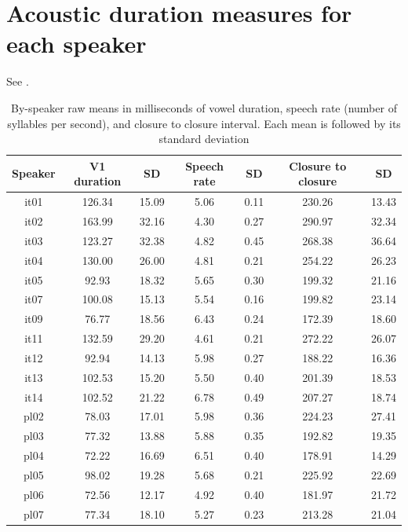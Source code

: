 \documentclass[preprint]{JASAnew}
\begin{document}
\hypertarget{acoustic-duration-measures-for-each-speaker}{%
\section{Acoustic duration measures for each
speaker}\label{acoustic-duration-measures-for-each-speaker}}

See .

\begin{table}

\caption{\label{tab:acoustic-measures-table}By-speaker raw means in milliseconds of vowel duration, speech rate (number of syllables per second), and closure to closure interval. Each mean is followed by its standard deviation}
\centering
\fontsize{10}{12}\selectfont
\begin{tabular}[t]{ccccccc}
\toprule
Speaker & V1 duration & SD & Speech rate & SD & Closure to closure & SD\\
\midrule
it01 & 126.34 & 15.09 & 5.06 & 0.11 & 230.26 & 13.43\\
it02 & 163.99 & 32.16 & 4.30 & 0.27 & 290.97 & 32.34\\
it03 & 123.27 & 32.38 & 4.82 & 0.45 & 268.38 & 36.64\\
it04 & 130.00 & 26.00 & 4.81 & 0.21 & 254.22 & 26.23\\
it05 & 92.93 & 18.32 & 5.65 & 0.30 & 199.32 & 21.16\\
it07 & 100.08 & 15.13 & 5.54 & 0.16 & 199.82 & 23.14\\
it09 & 76.77 & 18.56 & 6.43 & 0.24 & 172.39 & 18.60\\
it11 & 132.59 & 29.20 & 4.61 & 0.21 & 272.22 & 26.07\\
it12 & 92.94 & 14.13 & 5.98 & 0.27 & 188.22 & 16.36\\
it13 & 102.53 & 15.20 & 5.50 & 0.40 & 201.39 & 18.53\\
it14 & 102.52 & 21.22 & 6.78 & 0.49 & 207.27 & 18.74\\
pl02 & 78.03 & 17.01 & 5.98 & 0.36 & 224.23 & 27.41\\
pl03 & 77.32 & 13.88 & 5.88 & 0.35 & 192.82 & 19.35\\
pl04 & 72.22 & 16.69 & 6.51 & 0.40 & 178.91 & 14.29\\
pl05 & 98.02 & 19.28 & 5.68 & 0.21 & 225.92 & 22.69\\
pl06 & 72.56 & 12.17 & 4.92 & 0.40 & 181.97 & 21.72\\
pl07 & 77.34 & 18.10 & 5.27 & 0.23 & 213.28 & 21.04\\
\bottomrule
\end{tabular}
\end{table}
\end{document}
